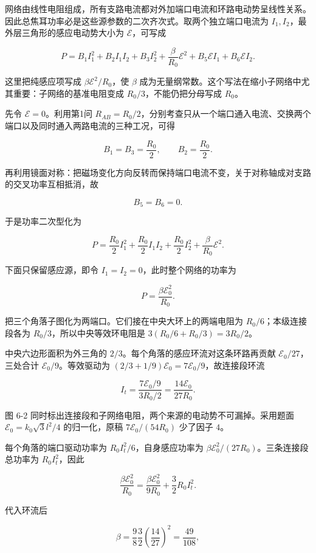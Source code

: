 \documentclass[12pt,a4paper,UTF8]{ctexart}
\begin{document}
网络由线性电阻组成，所有支路电流都对外加端口电流和环路电动势呈线性关系。因此总焦耳功率必是这些源参数的二次齐次式。取两个独立端口电流为
\(I_1,I_2\)，最外层三角形的感应电动势大小为 \(\mathcal E\)，可写成

\[
P=B_1I_1^2+B_2I_1I_2+B_3I_2^2
+\frac{\beta}{R_0}\mathcal E^2+B_5\mathcal EI_1+B_6\mathcal EI_2.
\]

这里把纯感应项写成 \(\beta\mathcal E^2/R_0\)，使 \(\beta\)
成为无量纲常数。这个写法在缩小子网络中尤其重要：子网络的基准电阻变成
\(R_0/3\)，不能仍把分母写成 \(R_0\)。

先令 \(\mathcal E=0\)。利用第1问
\(R_{AB}=R_0/2\)，分别考查只从一个端口通入电流、交换两个端口以及同时通入两路电流的三种工况，可得

\[B_1=B_3=\frac{R_0}{2},\qquad B_2=\frac{R_0}{2}.\]

再利用镜面对称：把磁场变化方向反转而保持端口电流不变，关于对称轴成对支路的交叉功率互相抵消，故

\[B_5=B_6=0.\]

于是功率二次型化为

\[
P=\frac{R_0}{2}I_1^2+\frac{R_0}{2}I_1I_2
+\frac{R_0}{2}I_2^2+\frac{\beta}{R_0}\mathcal E^2.
\]

下面只保留感应源，即令 \(I_1=I_2=0\)，此时整个网络的功率为

\[P=\frac{\beta\mathcal E_0^2}{R_0}.\]

把三个角落子图化为两端口。它们接在中央大环上的两端电阻为
\(R_0/6\)；本级连接段各为 \(R_0/3\)，所以中央等效环电阻是
\(3(R_0/6+R_0/3)=3R_0/2\)。

中央六边形面积为外三角的 \(2/3\)。每个角落的感应环流对这条环路再贡献
\(\mathcal E_0/27\)，三处合计 \(\mathcal E_0/9\)。等效驱动为
\((2/3+1/9)\mathcal E_0=7\mathcal E_0/9\)，故连接段环流

\[I_t=\frac{7\mathcal E_0/9}{3R_0/2}
=\boxed{\frac{14\mathcal E_0}{27R_0}}.\]

图 6-2 同时标出连接段和子网络电阻，两个来源的电动势不可漏掉。采用题面
\(\mathcal E_0=k_0\sqrt3l^2/4\) 的归一化，原稿 \(7\mathcal E_0/(54R_0)\)
少了因子 \(4\)。

每个角落的端口驱动功率为 \(R_0 I_t^2/6\)，自身感应功率为
\(\beta\mathcal E_0^2/(27R_0)\)。三条连接段总功率为 \(R_0I_t^2\)，因此

\[\frac{\beta\mathcal E_0^2}{R_0}
=\frac{\beta\mathcal E_0^2}{9R_0}+\frac32R_0I_t^2.\]

代入环流后

\[\beta=\frac98\frac32\left(\frac{14}{27}\right)^2
=\frac{49}{108},\]
\end{document}
